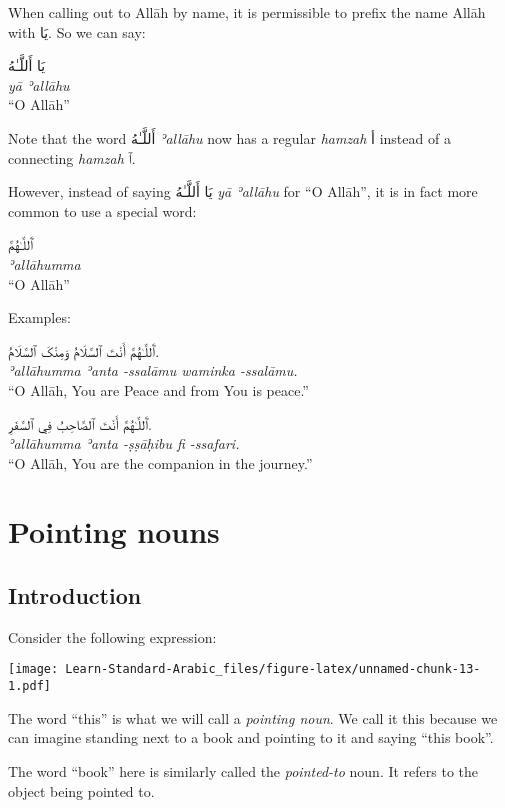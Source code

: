 \documentclass[
  10pt,
]{book}
\begin{document}
When calling out to Allāh by name, it is permissible to prefix the name Allāh with \foreignlanguage{arabic}{يَا}. So we can say:

\foreignlanguage{arabic}{يَا أَللَّـٰهُ}\\
\emph{yā ʾallāhu}\\
\enquote{O Allāh}

Note that the word \foreignlanguage{arabic}{أَللَّـٰهُ} \emph{ʾallāhu} now has a regular \emph{hamzah} \foreignlanguage{arabic}{أ} instead of a connecting \emph{hamzah} \foreignlanguage{arabic}{ٱ}.

However, instead of saying \foreignlanguage{arabic}{يَا أَللَّـٰهُ} \emph{yā ʾallāhu} for \enquote{O Allāh}, it is in fact more common to use a special word:

\foreignlanguage{arabic}{ٱَللَّـٰهُمَّ}\\
\emph{ʾallāhumma}\\
\enquote{O Allāh}

Examples:

\foreignlanguage{arabic}{ٱَللَّـٰهُمَّ أَنْتَ ٱلسَّلَامُ وَمِنْکَ ٱلسَّلَامُ.}\\
\emph{ʾallāhumma ʾanta -ssalāmu waminka -ssalāmu.}\\
\enquote{O Allāh, You are Peace and from You is peace.}

\foreignlanguage{arabic}{ٱَللَّـٰهُمَّ أَنْتَ ٱلصَّاحِبُ فِي ٱلسَّفَرِ.}\\
\emph{ʾallāhumma ʾanta -ṣṣāḥibu fi -ssafari.}\\
\enquote{O Allāh, You are the companion in the journey.}

\chapter{Pointing nouns}\label{pointing-nouns}

\section{Introduction}\label{introduction-14}

Consider the following expression:

\texttt{[image: Learn-Standard-Arabic\_files/figure-latex/unnamed-chunk-13-1.pdf]}

The word \enquote{this} is what we will call a \emph{pointing noun}. We call it this because we can imagine standing next to a book and pointing to it and saying \enquote{this book}.

The word \enquote{book} here is similarly called the \emph{pointed-to} noun. It refers to the object being pointed to.
\end{document}
